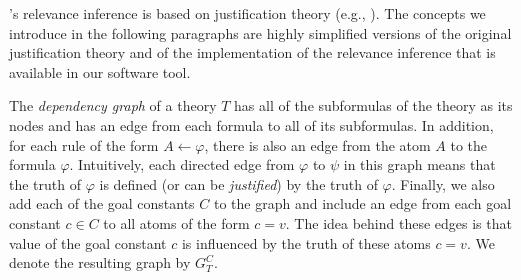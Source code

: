\idp's relevance inference is 
based on justification theory (e.g., \cite{lpnmr/DeneckerBS15}). 
The concepts we introduce in the following paragraphs are highly simplified versions of the original justification theory and of the implementation of the relevance inference that is available in our software tool. %

The \emph{dependency graph} of a theory $T$ has all of the subformulas of the theory as its nodes and has an edge from each formula to all of its subformulas. In addition, for each rule of the form $A \leftarrow \varphi$, there is also an edge from the atom $A$ to the formula $\varphi$. Intuitively, each directed edge from $\varphi$ to $\psi$ in this graph means that the truth of $\varphi$ is defined (or can be \emph{justified}) by the truth of $\varphi$. Finally, we also add each of the goal constants $C$ to the graph and include an edge from each goal constant $c \in C$ to all atoms of the form $c=v$. The idea behind these edges is that value of the goal constant $c$ is influenced by the truth of these atoms $c=v$. We denote the resulting graph by $G^C_T$.

